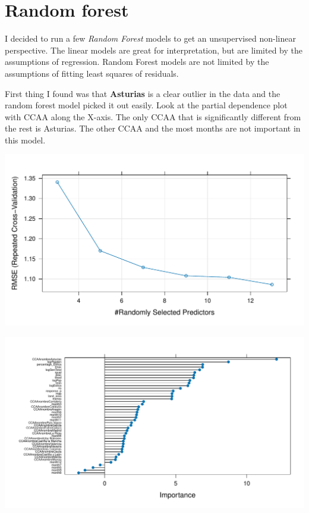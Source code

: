 \documentclass[
]{report}
\begin{document}
\hypertarget{random-forest}{%
\section{Random forest}\label{random-forest}}

I decided to run a few \emph{Random Forest} models to get an
unsupervised non-linear perspective. The linear models are great for
interpretation, but are limited by the assumptions of regression. Random
Forest models are not limited by the assumptions of fitting least
squares of residuals.

First thing I found was that \textbf{Asturias} is a clear outlier in the
data and the random forest model picked it out easily. Look at the
partial dependence plot with CCAA along the X-axis. The only CCAA that
is significantly different from the rest is Asturias. The other CCAA and
the most months are not important in this model.

\includegraphics{Modelling_Energy_Intensity-V3_files/figure-pdf/rf-tune-1.pdf}

\includegraphics{Modelling_Energy_Intensity-V3_files/figure-pdf/unnamed-chunk-3-1.pdf}
\end{document}
